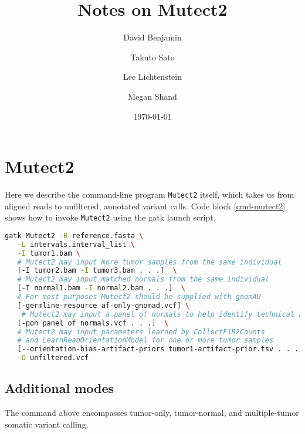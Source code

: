 \documentclass[nofootinbib,amssymb,amsmath]{revtex4}
\newcommand{\code}[1]{\texttt{#1}}
\begin{document}
\title{Notes on Mutect2}
\author{David Benjamin}
\author{Takuto Sato}
\author{Lee Lichtenstein}
\author{Megan Shand}

\date{\today}

\maketitle

\section{Mutect2}
Here we describe the command-line program \code{Mutect2} itself, which takes us from aligned reads to unfiltered, annotated variant calls.  Code block \ref{cmd-mutect2} shows how to invoke \code{Mutect2} using the gatk launch script.

\begin{lstlisting}[language=bash,caption={Mutect2 command}, label={cmd-mutect2}]
gatk Mutect2 -R reference.fasta \
   -L intervals.interval_list \
   -I tumor1.bam \
   # Mutect2 may input more tumor samples from the same individual 
   [-I tumor2.bam -I tumor3.bam . . .]  \
   # Mutect2 may input matched normals from the same individual
   [-I normal1.bam -I normal2.bam . . .]  \
   # For most purposes Mutect2 should be supplied with gnomAD
   [-germline-resource af-only-gnomad.vcf] \
    # Mutect2 may input a panel of normals to help identify technical artifacts
   [-pon panel_of_normals.vcf . . .]  \
   # Mutect2 may input parameters learned by CollectF1R2Counts
   # and LearnReadOrientationModel for one or more tumor samples
   [--orientation-bias-artifact-priors tumor1-artifact-prior.tsv . . .] \
   -O unfiltered.vcf
\end{lstlisting}

\subsection{Additional modes}
The command above encompasses tumor-only, tumor-normal, and multiple-tumor somatic variant calling.  
\end{document}
